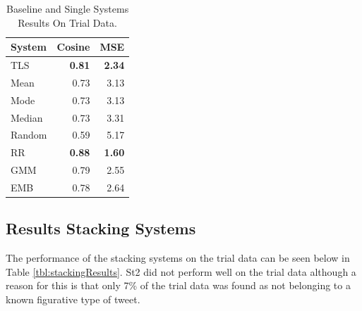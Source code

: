 \documentclass[11pt,letterpaper]{article}
\begin{document}
\begin{table}[!ht]
\begin{center}
\begin{tabular}{|l|r|r|}
\hline
System & Cosine & MSE\\
\hline
TLS & {\bf 0.81} & {\bf 2.34}\\
Mean & 0.73 & 3.13\\
Mode & 0.73 & 3.13\\
Median & 0.73 & 3.31\\
Random & 0.59  & 5.17\\
\hline
{\sc RR} & {\bf 0.88} & {\bf 1.60}\\
GMM & 0.79  & 2.55\\
EMB & 0.78 & 2.64\\
\hline
\end{tabular}
\end{center}
\caption{Baseline and Single Systems Results On Trial Data.}
\label{tbl:baselines}
\end{table}






\subsection{Results Stacking Systems}
The performance of the stacking systems on the trial data can be seen below in Table \ref{tbl:stackingResults}. {\sc St2} did not perform well on the trial data although a reason for this is that only 7\% of the trial data was found as not belonging to a known figurative type of tweet.
\end{document}
